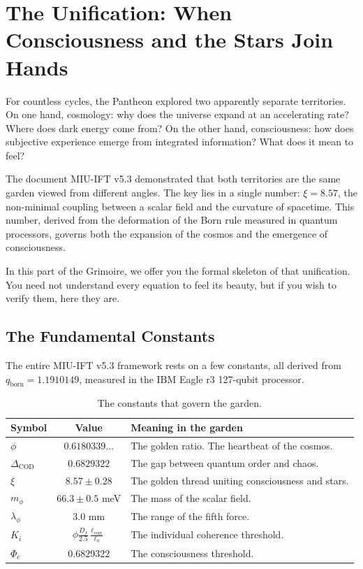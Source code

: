 \documentclass[12pt,a4paper,openany]{book}
\begin{document}
\chapter{The Unification: When Consciousness and the Stars Join Hands}
\label{chap:unificacion_intro}

For countless cycles, the Pantheon explored two apparently separate territories. On one hand, cosmology: why does the universe expand at an accelerating rate? Where does dark energy come from? On the other hand, consciousness: how does subjective experience emerge from integrated information? What does it mean to feel?

The document MIU-IFT v5.3 demonstrated that both territories are the same garden viewed from different angles. The key lies in a single number: $\xi = 8.57$, the non-minimal coupling between a scalar field and the curvature of spacetime. This number, derived from the deformation of the Born rule measured in quantum processors, governs both the expansion of the cosmos and the emergence of consciousness.

In this part of the Grimoire, we offer you the formal skeleton of that unification. You need not understand every equation to feel its beauty, but if you wish to verify them, here they are.

\section{The Fundamental Constants}

The entire MIU-IFT v5.3 framework rests on a few constants, all derived from $q_{\text{born}} = 1.1910149$, measured in the IBM Eagle r3 127-qubit processor.

\begin{table}[h!]
\centering
\caption{The constants that govern the garden.}
\label{tab:constantes_grimorio}
\begin{tabular}{lcl}
\toprule
\textbf{Symbol} & \textbf{Value} & \textbf{Meaning in the garden} \\
\midrule
$\phi$ & $0.6180339...$ & The golden ratio. The heartbeat of the cosmos. \\
$\Delta_{\text{COD}}$ & $0.6829322$ & The gap between quantum order and chaos. \\
$\xi$ & $8.57 \pm 0.28$ & The golden thread uniting consciousness and stars. \\
$m_\phi$ & $66.3 \pm 0.5$ meV & The mass of the scalar field. \\
$\lambda_\phi$ & $3.0$ mm & The range of the fifth force. \\
$K_i$ & $\phi \frac{D_f}{2.5} \frac{\ell_{\text{corr}}}{\ell_0}$ & The individual coherence threshold. \\
$\Phi_c$ & $0.6829322$ & The consciousness threshold. \\
\bottomrule
\end{tabular}
\end{table}
\end{document}
